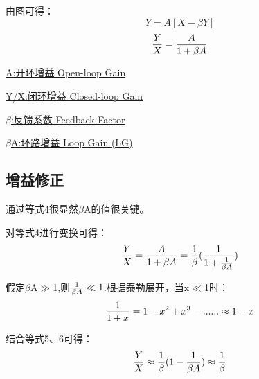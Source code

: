 \documentclass[]{ctexart}
\begin{document}
    由图可得：
    \begin{equation}
        Y=A[X-{\beta}Y]
    \end{equation}
    \begin{equation}
        {Y \over X}={A \over 1+{\beta}A}
    \end{equation}

    \underline{A:开环增益 Open-loop Gain}

    \underline{Y/X:闭环增益 Closed-loop Gain}

    \underline{$\beta$:反馈系数 Feedback Factor}

    \underline{$\beta$A:环路增益 Loop Gain (LG)}

\subsection{增益修正}
    通过等式4很显然$\beta$A的值很关键。

    对等式4进行变换可得：
    \begin{equation}
        {Y \over X}={A \over 1+{\beta}A}={1\over\beta}({1\over1+{1\over\beta A}})
    \end{equation}

    假定$\beta$A$\gg$1,则${1\over\beta A}\ll1$.根据泰勒展开，当x$\ll $1时：
    \begin{equation}
        {1 \over 1+x}=1-x^2+x^3-......\approx 1-x
    \end{equation}
    
    结合等式5、6可得：
    \begin{equation}
        {Y\over X}\approx{1\over\beta}(1-{1\over\beta A})\approx{1\over\beta}
    \end{equation}
\end{document}
